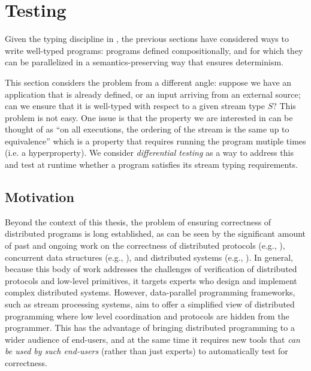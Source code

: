 \chapter{Testing}
\label{cha:testing}

Given the typing discipline in , the previous sections have considered ways to write well-typed programs: programs defined compositionally, and for which they can be parallelized in a semantics-preserving way that ensures determinism.

This section considers the problem from a different angle: suppose we have an application that is already defined, or an input arriving from an external source; can we ensure that it is well-typed with respect to a given stream type $S$?
This problem is not easy. One issue is that the property we are interested in can be thought of as ``on all executions, the ordering of the stream is the same up to equivalence'' which is a property that requires running the program mutiple times (i.e. a hyperproperty).
We consider \emph{differential testing} as a way to address this and test at runtime whether a program satisfies its stream typing requirements.

\section{Motivation}
\label{diffstream:sec:introduction}

Beyond the context of this thesis, the problem of ensuring correctness of distributed programs is long established, as can be seen by the significant amount of past and ongoing work on the correctness of distributed protocols (e.g., \cite{chand2016formal,abdulla2014optimal,padon2016ivy}), concurrent data structures (e.g., \cite{herlihy1990linearizability,burckhardt2014replicated}),
and distributed systems (e.g., \cite{ozkan2018randomized,wilcox2015verdi,hawblitzel2015ironfleet}).
In general, because this body of work addresses the challenges of verification of distributed protocols and low-level primitives, it targets experts who design and implement complex distributed systems.
However, data-parallel programming frameworks, such as stream processing systems, aim to offer a simplified view of distributed programming where low level coordination and protocols are hidden from the programmer. This has the advantage of bringing distributed programming to a wider audience of end-users, and at the same time it requires new tools that \emph{can be used by such end-users} (rather than just experts) to automatically test for correctness.

